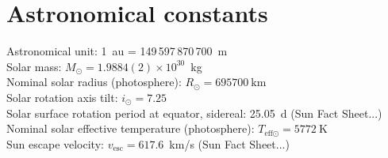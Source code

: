 


\section{Astronomical constants}
\label{sec:astronomical_constants}

Astronomical unit: 1~au = 149\,597\,870\,700~m \citep{USNO2015}\\ %
Solar mass: $M_\odot = 1.9884(2)\times10^{30}$~kg \citep{USNO2015}\\ %
Nominal solar radius (photosphere): $R_\odot = \SI{695700}{\km}$ \citep{Mamajek2015}\\ %
Solar rotation axis tilt: $i_\odot = 7.25$\textdegree{} \citep{USNO2015}\\ %
Solar surface rotation period at equator, sidereal: 25.05~d (Sun Fact Sheet...)\\
Nominal solar effective temperature (photosphere): $T_{\text{eff}\odot} = \SI{5772}{\kelvin}$ \citep{Mamajek2015}\\
Sun escape velocity: $v_\text{esc} = 617.6$~km/s (Sun Fact Sheet...)\\



